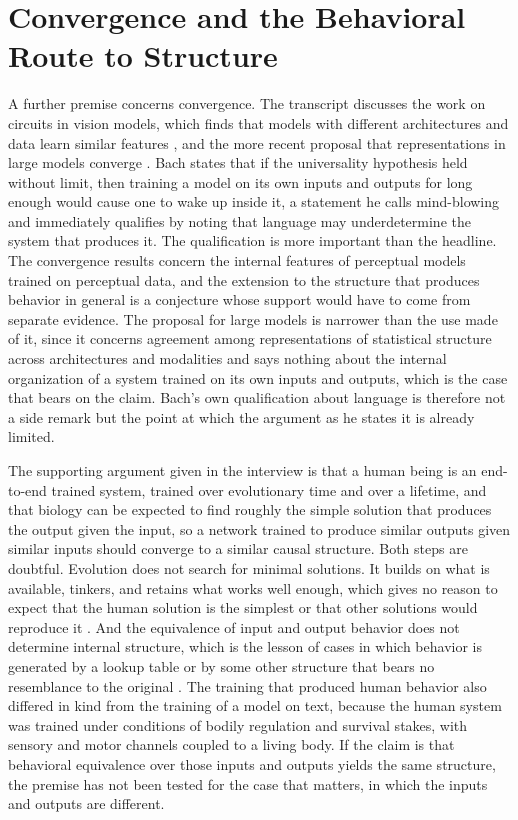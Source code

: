 \documentclass[11pt]{article}
\begin{document}
\section{Convergence and the Behavioral Route to Structure}

A further premise concerns convergence. The transcript discusses the work on circuits in vision models, which finds that models with different architectures and data learn similar features \cite{olah2020}, and the more recent proposal that representations in large models converge \cite{huh2024}. Bach states that if the universality hypothesis held without limit, then training a model on its own inputs and outputs for long enough would cause one to wake up inside it, a statement he calls mind-blowing and immediately qualifies by noting that language may underdetermine the system that produces it. The qualification is more important than the headline. The convergence results concern the internal features of perceptual models trained on perceptual data, and the extension to the structure that produces behavior in general is a conjecture whose support would have to come from separate evidence. The proposal for large models is narrower than the use made of it, since it concerns agreement among representations of statistical structure across architectures and modalities and says nothing about the internal organization of a system trained on its own inputs and outputs, which is the case that bears on the claim. Bach's own qualification about language is therefore not a side remark but the point at which the argument as he states it is already limited.

The supporting argument given in the interview is that a human being is an end-to-end trained system, trained over evolutionary time and over a lifetime, and that biology can be expected to find roughly the simple solution that produces the output given the input, so a network trained to produce similar outputs given similar inputs should converge to a similar causal structure. Both steps are doubtful. Evolution does not search for minimal solutions. It builds on what is available, tinkers, and retains what works well enough, which gives no reason to expect that the human solution is the simplest or that other solutions would reproduce it \cite{jacob1977}. And the equivalence of input and output behavior does not determine internal structure, which is the lesson of cases in which behavior is generated by a lookup table or by some other structure that bears no resemblance to the original \cite{block1981}. The training that produced human behavior also differed in kind from the training of a model on text, because the human system was trained under conditions of bodily regulation and survival stakes, with sensory and motor channels coupled to a living body. If the claim is that behavioral equivalence over those inputs and outputs yields the same structure, the premise has not been tested for the case that matters, in which the inputs and outputs are different.
\end{document}
